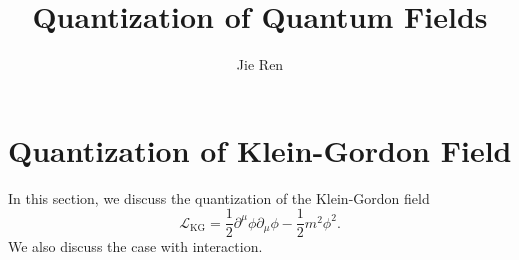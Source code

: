 \documentclass[aps,prb,superscriptaddress,nofootinbib]{revtex4}
\begin{document}
\title{Quantization of Quantum Fields}
\author{Jie Ren}



\maketitle

\tableofcontents




\section{Quantization of Klein-Gordon Field}

In this section, we discuss the quantization of the Klein-Gordon field
\begin{equation}
	\mathcal L_{\mathrm{KG}} = \frac{1}{2}\partial^\mu\phi\partial_\mu\phi -\frac{1}{2}m^2\phi^2.
\end{equation}
We also discuss the case with interaction.
\end{document}
